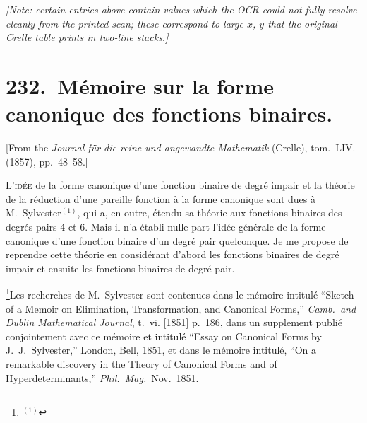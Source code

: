 \documentclass[11pt,a4paper]{book}
\theoremstyle{plain}
\begin{document}
\noindent
\textit{[Note: certain entries above contain values which the OCR could not fully resolve cleanly from the printed scan; these correspond to large $x$, $y$ that the original Crelle table prints in two-line stacks.]}
\newpage

\chapter[M\'{e}moire sur la forme canonique des fonctions binaires]{232.\ M\'{e}moire sur la forme canonique des fonctions binaires.}
\label{paper232}

\begin{center}
\small
[From the \textit{Journal f\"{u}r die reine und angewandte Mathematik} (Crelle), tom.~LIV. (1857), pp.~48--58.]
\end{center}

\bigskip

\textsc{L'id\'{e}e} de la forme canonique d'une fonction binaire de degr\'{e} impair et la th\'{e}orie de la r\'{e}duction d'une pareille fonction \`{a} la forme canonique sont dues \`{a} M.~Sylvester$^{(1)}$, qui a, en outre, \'{e}tendu sa th\'{e}orie aux fonctions binaires des degr\'{e}s pairs 4 et 6. Mais il n'a \'{e}tabli nulle part l'id\'{e}e g\'{e}n\'{e}rale de la forme canonique d'une fonction binaire d'un degr\'{e} pair quelconque. Je me propose de reprendre cette th\'{e}orie en consid\'{e}rant d'abord les fonctions binaires de degr\'{e} impair et ensuite les fonctions binaires de degr\'{e} pair.

\footnote{$^{(1)}$}{Les recherches de M.~Sylvester sont contenues dans le m\'{e}moire intitul\'{e} ``Sketch of a Memoir on Elimination, Transformation, and Canonical Forms,'' \textit{Camb.\ and Dublin Mathematical Journal}, t.~vi. [1851] p.~186, dans un supplement publi\'{e} conjointement avec ce m\'{e}moire et intitul\'{e} ``Essay on Canonical Forms by J.~J.~Sylvester,'' London, Bell, 1851, et dans le m\'{e}moire intitul\'{e}, ``On a remarkable discovery in the Theory of Canonical Forms and of Hyperdeterminants,'' \textit{Phil.\ Mag.}\ Nov.\ 1851.}
\end{document}
